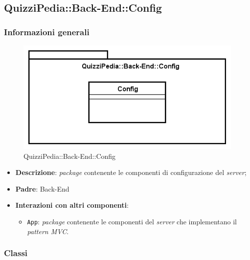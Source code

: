 \subsection{QuizziPedia::Back-End::Config}
\subsubsection{Informazioni generali}
\label{QuizziPedia::Back-End::Config}
\begin{figure}[ht]
	\centering
	\includegraphics[scale=0.45]{UML/Package/QuizziPedia_Back-End_Config.png}
	\caption{QuizziPedia::Back-End::Config}
\end{figure}
\FloatBarrier
	\begin{itemize}
		\item \textbf{Descrizione}:
		\textit{package} contenente le componenti di configurazione del \textit{server};
		\item \textbf{Padre}: Back-End
		\item \textbf{Interazioni con altri componenti}:
			\begin{itemize}
				\item \texttt{App}:
				\textit{package} contenente le componenti del \textit{server} che implementano il \textit{pattern MVC}.
			\end{itemize}
	\end{itemize}
\subsubsection{Classi}
